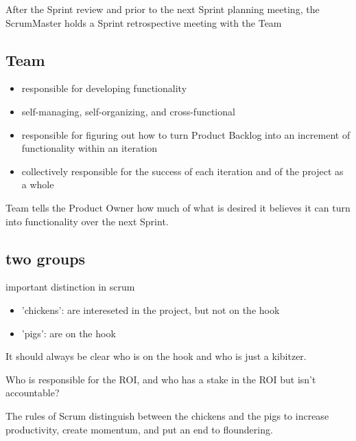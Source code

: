 After the Sprint review and prior to the next Sprint planning meeting, the ScrumMaster holds a Sprint retrospective meeting with the Team


\subsection{Team}

\begin{itemize}
  \item responsible for developing functionality
  \item self-managing, self-organizing, and cross-functional
  \item responsible for figuring out how to turn Product Backlog into an increment of functionality within an iteration
  \item collectively responsible for the success of each iteration and of the project as a whole
\end{itemize}

Team tells the Product Owner how much of what is desired it believes it can turn into functionality over the next Sprint.


\subsection{two groups}
important distinction in scrum
\begin{itemize}
  \item 'chickens': are intereseted in the project, but not on the hook
  \item 'pigs': are on the hook
\end{itemize}

It should always be clear who is on the hook and who is just a kibitzer.

Who is responsible for the ROI, and who has a stake in the ROI but isn’t accountable?

The rules of Scrum distinguish between the chickens and the pigs to increase productivity, create momentum, and put an end to floundering. 